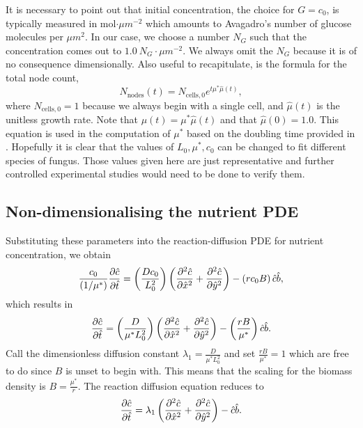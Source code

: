 It is necessary to point out that initial concentration, the choice for $G = c_0$, is 
typically measured in mol$\cdot \mu m^{-2}$ which amounts to Avagadro's number of 
glucose molecules per $\mu m^{2}$. In our case, we choose a number $N_G$ such that 
the concentration comes out to $1.0 \ N_G \cdot \mu m^{-2}$. We always
omit the $N_G$ because it is of no consequence dimensionally.
Also useful to recapitulate, is the formula for the total node count,
\begin{equation}  
    N_{\textrm{nodes}}(t) = N_{\textrm{cells},0} e^{ t \mu^* \hat{\mu}(t)},
\end{equation}
where $N_{\textrm{cells},0} = 1$ because we always begin with a single cell,
and $\hat{\mu}(t)$ is the unitless growth rate. Note that
$\mu(t) = \mu^* \hat{\mu}(t)$ and that $\hat{\mu}(0) = 1.0$.
This equation is used in the computation of $\mu^*$ based on the doubling time
provided in \cite{salari2017investigation}.
Hopefully it is clear that
the values of $L_0, \mu^*, c_0$
can be changed to fit different species of fungus. Those values given here
are just representative and further controlled experimental studies would 
need to be done to verify them.

\subsection{Non-dimensionalising the nutrient PDE}

Substituting these parameters into the reaction-diffusion PDE for nutrient concentration, we obtain 
\begin{equation*}
    \frac{c_0}{(1/\mu^*)}\pdv{\hat{c}}{\hat{t}} = \left(\frac{D c_0}{ L_0^2} \right)\left(\pdv[2]{\hat{c}}{\hat{x}} + \pdv[2]{\hat{c}}{\hat{y}} \right) -
      \left( r c_0 B\right)  \hat{c}\hat{b},
\end{equation*}
which results in 
\begin{equation*}
    \pdv{\hat{c}}{\hat{t}} = \left(\frac{D}{ \mu^* L_0^2} \right)\left(\pdv[2]{\hat{c}}{\hat{x}} + \pdv[2]{\hat{c}}{\hat{y}} \right) -
      \left( \frac{r  B}{\mu^*}\right)  \hat{c}\hat{b}.
\end{equation*}
Call the dimensionless diffusion constant $\lambda_1 = \frac{D}{ \mu^* L_0^2}$ and 
set $\frac{r  B}{\mu^*}=1$ which are free to do since $B$ is unset to begin with. This means 
that the scaling for the biomass density is $B = \frac{\mu^*}{r}$. The reaction diffusion equation 
reduces to 
\begin{equation*}
    \pdv{\hat{c}}{\hat{t}} = \lambda_1 \left(\pdv[2]{\hat{c}}{\hat{x}} + \pdv[2]{\hat{c}}{\hat{y}} \right) -
      \hat{c}\hat{b}.
\end{equation*}

